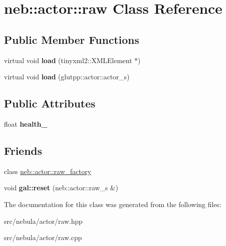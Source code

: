 \hypertarget{classneb_1_1actor_1_1raw}{
\section{neb::actor::raw Class Reference}
\label{classneb_1_1actor_1_1raw}
}
\subsection*{Public Member Functions}
\begin{DoxyCompactItemize}
\item 
\hypertarget{classneb_1_1actor_1_1raw_aa2f7c6b6e4294372cad47aa0b91a9fc9}{
virtual void {\bfseries load} (tinyxml2::XMLElement $\ast$)}
\label{classneb_1_1actor_1_1raw_aa2f7c6b6e4294372cad47aa0b91a9fc9}

\item 
\hypertarget{classneb_1_1actor_1_1raw_afd4edc5f0017cc3985de1d2babb1f6e4}{
virtual void {\bfseries load} (glutpp::actor::actor\_\-s)}
\label{classneb_1_1actor_1_1raw_afd4edc5f0017cc3985de1d2babb1f6e4}

\end{DoxyCompactItemize}
\subsection*{Public Attributes}
\begin{DoxyCompactItemize}
\item 
\hypertarget{classneb_1_1actor_1_1raw_aba2ece917e3659e63af9e8a07161c8d7}{
float {\bfseries health\_\-}}
\label{classneb_1_1actor_1_1raw_aba2ece917e3659e63af9e8a07161c8d7}

\end{DoxyCompactItemize}
\subsection*{Friends}
\begin{DoxyCompactItemize}
\item 
\hypertarget{classneb_1_1actor_1_1raw_a17cdde3fce5e696f7e7bd989debceee3}{
class \hyperlink{classneb_1_1actor_1_1raw_a17cdde3fce5e696f7e7bd989debceee3}{neb::actor::raw\_\-factory}}
\label{classneb_1_1actor_1_1raw_a17cdde3fce5e696f7e7bd989debceee3}

\item 
\hypertarget{classneb_1_1actor_1_1raw_a3fa0d77ecd90bdcdfc8303ddc5194947}{
void {\bfseries gal::reset} (neb::actor::raw\_\-s \&)}
\label{classneb_1_1actor_1_1raw_a3fa0d77ecd90bdcdfc8303ddc5194947}

\end{DoxyCompactItemize}


The documentation for this class was generated from the following files:\begin{DoxyCompactItemize}
\item 
src/nebula/actor/raw.hpp\item 
src/nebula/actor/raw.cpp\end{DoxyCompactItemize}
